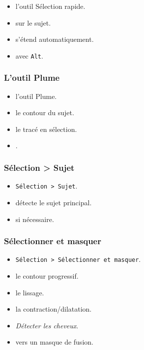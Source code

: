 \begin{itemize}
    \item {} l'outil Sélection rapide.
    \item {} sur le sujet.
    \item {} s'étend automatiquement.
    \item {} avec \texttt{Alt}.
\end{itemize}

\subsubsection{L'outil Plume}

\begin{itemize}
    \item {} l'outil Plume.
    \item {} le contour du sujet.
    \item {} le tracé en sélection.
    \item {}.
\end{itemize}

\subsubsection{Sélection > Sujet}

\begin{itemize}
    \item {} \texttt{Sélection > Sujet}.
    \item {} détecte le sujet principal.
    \item {} si nécessaire.
\end{itemize}

\subsubsection{Sélectionner et masquer}

\begin{itemize}
    \item {} \texttt{Sélection > Sélectionner et masquer}.
    \item {} le contour progressif.
    \item {} le lissage.
    \item {} la contraction/dilatation.
    \item {} \emph{Détecter les cheveux}.
    \item {} vers un masque de fusion.
\end{itemize}

